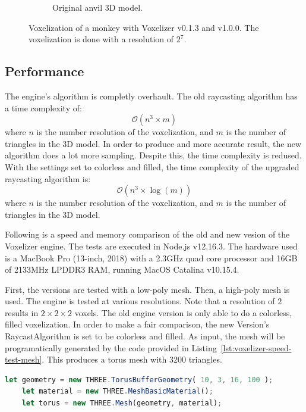 \begin{figure}[hp!]
\begin{subfigure}[b]{0.7\textwidth}
        \caption{Original anvil 3D model.}
        \label{fig:result-original-anvil}
    \end{subfigure}
    \hfill
    \caption{Voxelization of a monkey with Voxelizer v0.1.3 and v1.0.0. The voxelization is done with a resolution of $2^7$.}
    \label{fig:result-voxelizer-comparison-anvil}
\end{figure}
\clearpage
\subsection{Performance}
\label{sec:result-voxelizer-performance}
The engine's algorithm is completly overhault. The old raycasting algorithm has a time complexity of:
\[ \mathcal{O}(n^3\times m) \]
where $n$ is the number resolution of the voxelization, and $m$ is the number of triangles in the 3D model. In order to produce and more accurate result, the new algorithm does a lot more sampling. Despite this, the time complexity is redused. With the settings set to colorless and filled, the time complexity of the upgraded raycasting algorithm is:
\[ \mathcal{O}(n^3\times \log(m)) \]
where $n$ is the number resolution of the voxelization, and $m$ is the number of triangles in the 3D model.

Following is a speed and memory comparison of the old and new vesion of the Voxelizer engine. The tests are executed in Node.js v12.16.3. The hardware used is a MacBook Pro (13-inch, 2018) with a 2.3GHz quad core processor and 16GB of 2133MHz LPDDR3 RAM, running MacOS Catalina v10.15.4.

First, the versions are tested with a low-poly mesh. Then, a high-poly mesh is used. The engine is tested at various resolutions. Note that a resolution of $2$ results in $2\times2\times2$ voxels. The old engine version is only able to do a colorless, filled voxelization. In order to make a fair comparison, the new Version's RaycastAlgorithm is set to be colorless and filled. As input, the mesh will be programatically generated by the code provided in Listing~\ref{lst:voxelizer-speed-test-mesh}. This produces a torus mesh with 3200 triangles.
\begin{lstlisting}[language=JavaScript,caption={JS code for generating low-detailed torus mesh.},label={lst:voxelizer-speed-test-mesh}]
    let geometry = new THREE.TorusBufferGeometry( 10, 3, 16, 100 );
    let material = new THREE.MeshBasicMaterial();
    let torus = new THREE.Mesh(geometry, material);
\end{lstlisting}

